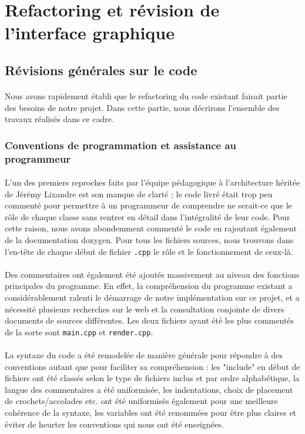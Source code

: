 \newpage
\section{Refactoring et révision de l'interface graphique}

\subsection{Révisions générales sur le code}
\paragraph{}
Nous avons rapidement établi que le refactoring du code existant
faisait partie des besoins de notre projet. Dans cette partie, nous
décrirons l'ensemble des travaux réalisés dans ce cadre.

\subsubsection{Conventions de programmation et assistance au programmeur}
\paragraph{}
L'un des premiers reproches faits par l'équipe pédagogique à
l'architecture héritée de Jérémy Lixandre est son manque de clarté ;
le code livré était trop peu commenté pour permettre à un programmeur
de comprendre ne serait-ce que le rôle de chaque classe sans rentrer
en détail dans l'intégralité de leur code. Pour cette raison, nous
avons abondemment commenté le code en rajoutant également de la documentation
doxygen. Pour tous les fichiers sources, nous trouvons dans l'en-tête de chaque
début de fichier \verb!.cpp! le rôle et le fonctionnement de ceux-là.
\paragraph{}
Des commentaires ont également été ajoutés massivement au niveau des
fonctions principales du programme. En effet, la compréhension du
programme existant a considérablement ralenti le démarrage de notre
implémentation sur ce projet, et a nécessité plusieurs recherches sur
le web et la consultation conjointe de divers documents de sources
différentes. Les deux fichiers ayant été les plus commentés de la
sorte sont \verb!main.cpp! et \verb!render.cpp!.
\paragraph{}
La syntaxe du code a été remodelée de manière générale pour répondre à
des conventions autant que pour faciliter sa compréhension : les
"include" en début de fichiers ont été classés selon le type de
fichiers inclus et par ordre alphabétique, la langue des commentaires
a été uniformisée, les indentations, choix de placement de
crochets/accolades etc. ont été uniformisés également pour une
meilleure cohérence de la syntaxe, les variables ont été renommées
pour être plus claires et éviter de heurter les conventions qui nous
ont été enseignées.

